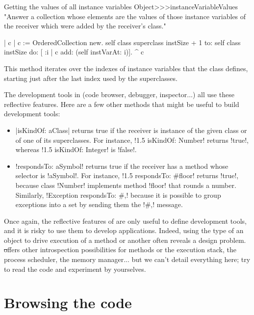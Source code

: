 \documentclass[a4paper,10pt,twoside]{book}
\begin{document}
\begin{method}[instanceVariableValues]{Getting the values of all instance variables}
Object>>>instanceVariableValues
	"Answer a collection whose elements are the values of those instance variables of the receiver which were added by the receiver's class."
	
	| c |
	c := OrderedCollection new.
	self class superclass instSize + 1
		to: self class instSize
		do: [ :i | c add: (self instVarAt: i)].
	^ c
\end{method}

This method iterates over the indexes of instance variables that the class defines, starting just after the last index used by the superclasses.

The development tools in \sq (code browser, debugger, inspector...) all use these reflective features.
Here are a few other methods that might be useful to build development tools:
\begin{itemize}
	\item \ct|isKindOf: aClass| returns true if the receiver is instance of the given class or of one of its superclasses.
	For instance, \ct!1.5 isKindOf: Number! returns \ct!true!, whereas \ct!1.5 isKindOf: Integer! is \ct!false!.
	\item \ct!respondsTo: aSymbol! returns true if the receiver has a method whose selector is \ct!aSymbol!.
	For instance, \ct!1.5 respondsTo: #floor! returns \ct!true!, because class \ct!Number! implements method \ct!floor! that rounds a number.
	Similarly, \ct!Exception respondsTo: #,! because it is possible to group exceptions into a set by sending them the \ct!#,! message.
\end{itemize}

Once again, the reflective features of \sq are only useful to define development tools, and it is risky to use them to develop applications.
Indeed, using the type of an object to drive execution of a method or another often reveals a design problem.
\st offers other introspection possibilities for methods or the execution stack, the process scheduler, the memory manager... but we can't detail everything here; try to read the code and experiment by yourselves.



\section{Browsing the code} %
\end{document}
